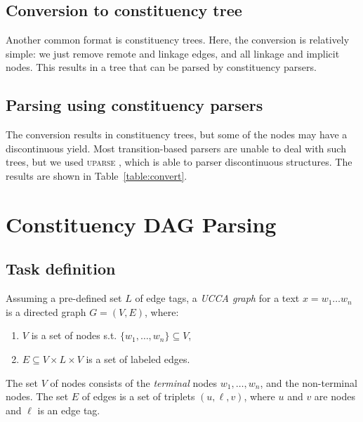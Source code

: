 \documentclass[11pt]{article}
\begin{document}
%
%
%

\subsection{Conversion to constituency tree}

Another common format is constituency trees. Here, the conversion is relatively simple: we just remove remote and linkage edges, and all linkage and implicit nodes. This results in a tree that can be parsed by constituency parsers.

\subsection{Parsing using constituency parsers}

The conversion results in constituency trees, but some of the nodes may have a discontinuous yield. Most transition-based parsers are unable to deal with such trees, but we used \textsc{uparse} \cite{maier2015discontinuous}, which is able to parser discontinuous structures. The results are shown in Table~\ref{table:convert}.

\section{Constituency DAG Parsing}

\subsection{Task definition}

Assuming a pre-defined set $L$ of edge tags, a \textit{UCCA graph} for a text $x=w_1 \ldots w_n$ is a directed graph $G=(V,E)$, where:
\begin{enumerate}
 \item $V$ is a set of nodes s.t. $\{w_1, \ldots, w_n\} \subseteq V$,
 \item $E \subseteq V \times L \times V$ is a set of labeled edges.
\end{enumerate}
The set $V$ of nodes consists of the \textit{terminal} nodes $w_1, \ldots, w_n$, and the non-terminal nodes. The set $E$ of edges is a set of triplets $(u, \ell, v)$, where $u$ and $v$ are nodes and $\ell$ is an edge tag.
\end{document}
